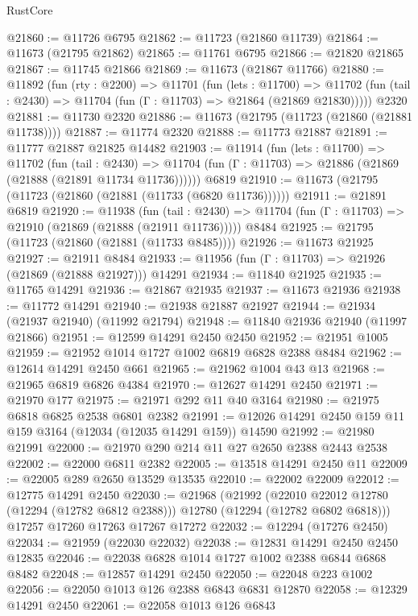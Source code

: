 \begin{lexlean}{RustCore}
\begin{coremodule}
@21860 := @11726 @6795
@21862 := @11723 (@21860 @11739)
@21864 := @11673 (@21795 @21862)
@21865 := @11761 @6795
@21866 := @21820 @21865
@21867 := @11745 @21866
@21869 := @11673 (@21867 @11766)
@21880 := @11892
    (fun (rty : @2200) =>
    @11701
      (fun (lets : @11700) =>
      @11702 (fun (tail : @2430) => @11704 (fun (Γ : @11703) => @21864 (@21869 @21830)))))
    @2320
@21881 := @11730 @2320
@21886 := @11673 (@21795 (@11723 (@21860 (@21881 @11738))))
@21887 := @11774 @2320
@21888 := @11773 @21887
@21891 := @11777 @21887 @21825 @14482
@21903 := @11914
    (fun (lets : @11700) =>
    @11702
      (fun (tail : @2430) =>
      @11704 (fun (Γ : @11703) => @21886 (@21869 (@21888 (@21891 @11734 @11736))))))
    @6819
@21910 := @11673 (@21795 (@11723 (@21860 (@21881 (@11733 (@6820 @11736))))))
@21911 := @21891 @6819
@21920 := @11938
    (fun (tail : @2430) => @11704 (fun (Γ : @11703) => @21910 (@21869 (@21888 (@21911 @11736)))))
    @8484
@21925 := @21795 (@11723 (@21860 (@21881 (@11733 @8485))))
@21926 := @11673 @21925
@21927 := @21911 @8484
@21933 := @11956 (fun (Γ : @11703) => @21926 (@21869 (@21888 @21927))) @14291
@21934 := @11840 @21925
@21935 := @11765 @14291
@21936 := @21867 @21935
@21937 := @11673 @21936
@21938 := @11772 @14291
@21940 := @21938 @21887 @21927
@21944 := @21934 (@21937 @21940) (@11992 @21794)
@21948 := @11840 @21936 @21940 (@11997 @21866)
@21951 := @12599 @14291 @2450 @2450
@21952 := @21951 @1005
@21959 := @21952 @1014 @1727 @1002 @6819 @6828 @2388 @8484
@21962 := @12614 @14291 @2450 @661
@21965 := @21962 @1004 @43 @13
@21968 := @21965 @6819 @6826 @4384
@21970 := @12627 @14291 @2450
@21971 := @21970 @177
@21975 := @21971 @292 @11 @40 @3164
@21980 := @21975 @6818 @6825 @2538 @6801 @2382
@21991 := @12026 @14291 @2450 @159 @11 @159 @3164 (@12034 (@12035 @14291 @159)) @14590
@21992 := @21980 @21991
@22000 := @21970 @290 @214 @11 @27 @2650 @2388 @2443 @2538
@22002 := @22000 @6811 @2382
@22005 := @13518 @14291 @2450 @11
@22009 := @22005 @289 @2650 @13529 @13535
@22010 := @22002 @22009
@22012 := @12775 @14291 @2450
@22030 := @21968
    (@21992
      (@22010 @22012 @12780 (@12294 (@12782 @6812 @2388)))
      @12780
      (@12294 (@12782 @6802 @6818)))
    @17257
    @17260
    @17263
    @17267
    @17272
@22032 := @12294 (@17276 @2450)
@22034 := @21959 (@22030 @22032)
@22038 := @12831 @14291 @2450 @2450 @12835
@22046 := @22038 @6828 @1014 @1727 @1002 @2388 @6844 @6868 @8482
@22048 := @12857 @14291 @2450
@22050 := @22048 @223 @1002
@22056 := @22050 @1013 @126 @2388 @6843 @6831 @12870
@22058 := @12329 @14291 @2450
@22061 := @22058 @1013 @126 @6843

\end{coremodule}
\end{lexlean}
